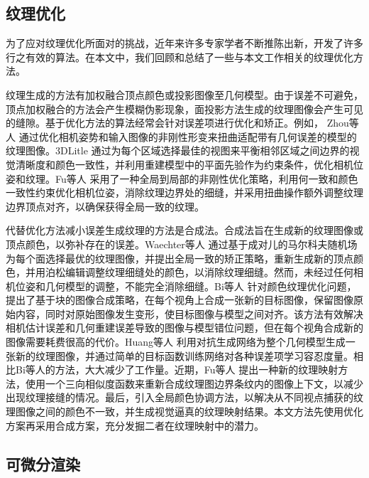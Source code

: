 \subsection{纹理优化}
为了应对纹理优化所面对的挑战，近年来许多专家学者不断推陈出新，开发了许多行之有效的算法。在本文中，我们回顾和总结了一些与本文工作相关的纹理优化方法。\par
\vspace*{2mm}纹理生成的方法有加权融合顶点颜色或投影图像至几何模型。由于误差不可避免，顶点加权融合的方法会产生模糊伪影现象，面投影方法生成的纹理图像会产生可见的缝隙。基于优化方法的算法经常会针对误差项进行优化和矫正。例如， Zhou等人 通过优化相机姿势和输入图像的非刚性形变来扭曲适配带有几何误差的模型的纹理图像。3DLitle 通过为每个区域选择最佳的视图来平衡相邻区域之间边界的视觉清晰度和颜色一致性，并利用重建模型中的平面先验作为约束条件，优化相机位姿和纹理。Fu等人 采用了一种全局到局部的非刚性优化策略，利用何一致和颜色一致性约束优化相机位姿，消除纹理边界处的细缝，并采用扭曲操作额外调整纹理边界顶点对齐，以确保获得全局一致的纹理。

\vspace*{2mm}代替优化方法减小误差生成纹理的方法是合成法。合成法旨在生成新的纹理图像或顶点颜色，以弥补存在的误差。Waechter等人 通过基于成对儿的马尔科夫随机场为每个面选择最优的纹理图像，并提出全局一致的矫正策略，重新生成新的顶点颜色，并用泊松编辑调整纹理细缝处的颜色，以消除纹理细缝。然而，未经过任何相机位姿和几何模型的调整，不能完全消除细缝。Bi等人 针对颜色纹理优化问题，提出了基于块的图像合成策略，在每个视角上合成一张新的目标图像，保留图像原始内容，同时对原始图像发生变形，使目标图像与模型之间对齐。该方法有效解决相机估计误差和几何重建误差导致的图像与模型错位问题，但在每个视角合成新的图像需要耗费很高的代价。Huang等人 利用对抗生成网络为整个几何模型生成一张新的纹理图像，并通过简单的目标函数训练网络对各种误差项学习容忍度量。相比Bi等人的方法，大大减少了工作量。近期，Fu等人 提出一种新的纹理映射方法，使用一个三向相似度函数来重新合成纹理图边界条纹内的图像上下文，以减少出现纹理接缝的情况。最后，引入全局颜色协调方法，以解决从不同视点捕获的纹理图像之间的颜色不一致，并生成视觉逼真的纹理映射结果。本文方法先使用优化方案再采用合成方案，充分发掘二者在纹理映射中的潜力。

\subsection{可微分渲染}

